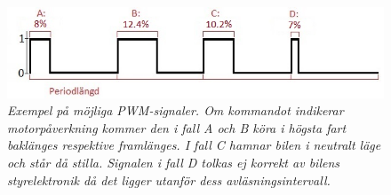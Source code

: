 \documentclass[a4paper]{article}
\begin{document}
\begin{figure}[H]
\includegraphics[scale=1]{PWMsignals.jpg}
\centering
\caption{\it Exempel på möjliga PWM-signaler. Om kommandot indikerar motorpåverkning kommer den i fall A och B köra i högsta fart baklänges respektive framlänges. I fall C hamnar bilen i neutralt läge och står då stilla. Signalen i fall D tolkas ej korrekt av bilens styrelektronik då det ligger utanför dess avläsningsintervall.}
\end{figure} 

\end{document}
